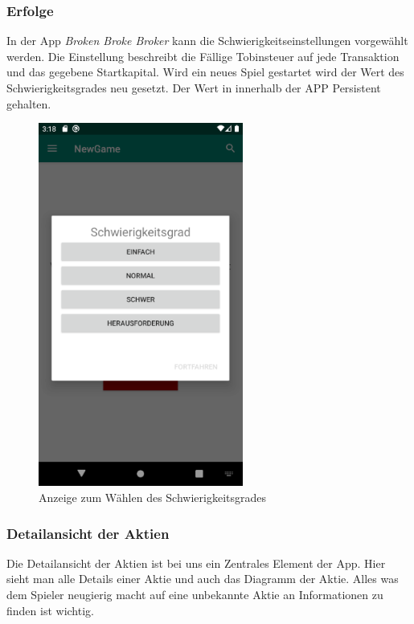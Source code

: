 \documentclass[10pt]{scrartcl}
\begin{document}
	\subsubsection{Erfolge}
	In der App \textit{Broken Broke Broker} kann die Schwierigkeitseinstellungen vorgewählt werden. Die Einstellung beschreibt die Fällige Tobinsteuer auf jede Transaktion und das gegebene Startkapital. Wird ein neues Spiel gestartet wird der Wert des Schwierigkeitsgrades neu gesetzt. Der Wert in innerhalb der APP Persistent gehalten.
	\begin{figure}[H]
		\centering
		\includegraphics[width=0.6\textwidth]{Bilder/Prsi/diff.png}
		\caption{Anzeige zum Wählen des Schwierigkeitsgrades}
	\end{figure}
	 
	\subsubsection{Detailansicht der Aktien}
	Die Detailansicht der Aktien ist bei uns ein Zentrales Element der App. Hier sieht man alle Details einer Aktie und auch das Diagramm der Aktie. Alles was dem Spieler neugierig macht auf eine unbekannte Aktie an Informationen zu finden ist wichtig.
	
\end{document}
